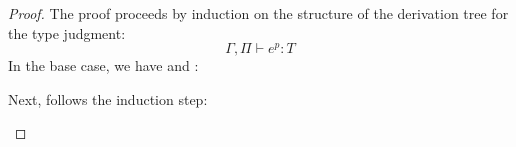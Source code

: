 \documentclass[../../../master.tex]{subfiles}
\begin{document}
\begin{proof}
	The proof proceeds by induction on the structure of the derivation tree for the type judgment:
	$$\Gamma,\Pi\vdash e^{p}:T$$
	In the base case, we have  and :
	\begin{description}
		
		
	\end{description}

	Next, follows the induction step:
	\begin{description}
		
		
		
		
		
		
		
		
		
	\end{description}
\end{proof}
\end{document}
